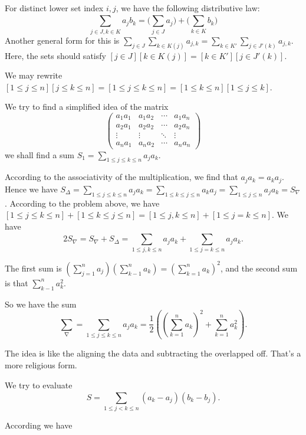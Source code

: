  For distinct lower set index $i,j$, we have the
following distributive law: 
\[
    \sum_{j\in J,k\in K}^{}a_jb_k = \big( \sum_{j\in J}^{}a_j \big) + \big(
    \sum_{k\in K}^{}b_k \big)
\]
Another general form for this is $\sum_{j\in J}^{}\sum_{k\in
K(j)}^{}a_{j,k}=\sum_{k \in K'}^{} \sum_{j\in J'(k)}^{}a_{j, k}$. Here, the sets
should satisfy $[j \in J][k \in K(j)] = [k \in K'][j \in J'(k)]. $

 We may rewrite $[1\leq j\leq n][j\leq
k\leq n] = [1\leq j\leq k\leq n] = [1\leq k\leq n][1\leq j\leq k]$. 

We try to find a simplified idea of the matrix
\[
    \left(\begin{matrix}
            a_1a_1& a_1a_2 & \cdots & a_1a_n \\
            a_2a_1&a_2a_2&\cdots & a_2a_n\\
            \vdots & \vdots & \ddots & \vdots \\
            a_na_1 & a_na_2&\cdots & a_na_n
    \end{matrix}\right)
\]
we shall find a sum $S_1 = \sum_{1\leq j\leq k\leq n}^{}a_ja_k$. 

According to the associativity of the multiplication, we find that $a_j a_k= a_k
a_j$. Hence we have $S_\Delta = \sum_{1\leq j\leq k\leq n}^{}a_ja_k =
\sum_{1\leq k\leq j\leq n}^{}a_ka_j=\sum_{1\leq j\leq n}^{}a_ja_k=S_\nabla$.
According to the problem above, we have $[1\leq j\leq k\leq n]+[1\leq k\leq
j\leq n]=[1\leq j,k\leq n]+[1\leq j=k\leq n]$. We have 
\[
    2S_\nabla = S_\nabla + S_\Delta = \sum_{1\leq j,k\leq n}^{}a_ja_k + 
    \sum_{1\leq j=k\leq n}^{} a_j a_k. 
\]

The first sum is $\left( \sum_{j=1}^{n}a_j \right) \left( \sum_{k-1}^{n} a_k \right) = \left( \sum_{k=1}^{n}a_k  \right)^2$, and the second sum is that $\sum_{k-1}^{n}a_k^2$. 

So we have the sum 
\[
    \sum_{\nabla}^{} = \sum_{1\leq j\leq k\leq n}^{}a_ja_k = \frac{1}{2} \left(
    \left( \sum_{k=1}^{n} a_k \right)^2 + \sum_{k=1}^{n}a_k^2\right).
\]

The idea is like the aligning the data and subtracting the overlapped off.
That's a more religious form. 

 We try to evaluate 
\[
    S=\sum_{1\leq j< k\leq n}^{} (a_k-a_j)(b_k-b_j).
\]

According we have 
